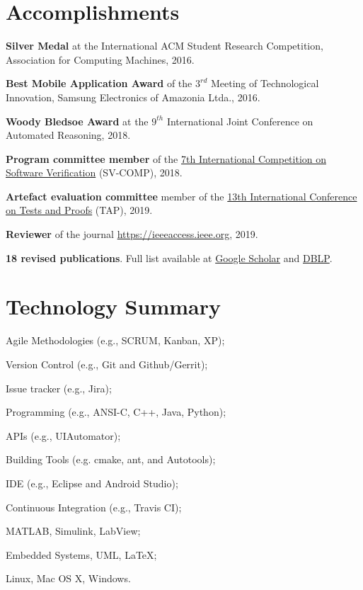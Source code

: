 \documentclass[letterpaper]{article}
\renewenvironment{itemize}{
  \begin{list}{}{
    \setlength{\leftmargin}{1.5em}
  }
}{
  \end{list}
}
\begin{document}
\section*{Accomplishments}
\begin{itemize}
  \item {\bf Silver Medal} at the International ACM Student Research Competition, Association for Computing Machines, 2016.

  \item {\bf Best Mobile Application Award} of the $3^{rd}$ Meeting of Technological Innovation, Samsung Electronics of Amazonia Ltda., 2016.
  
  \item {\bf Woody Bledsoe Award} at the $9^{th}$ International Joint Conference on Automated Reasoning, 2018.
  
  \item {\bf Program committee member} of the \href{https://sv-comp.sosy-lab.org/2018/committee.php}{7th International Competition on Software Verification} (SV-COMP), 2018.
  
  \item {\bf Artefact evaluation committee} member of the \href{https://tap.sosy-lab.org/2019/committee.php}{13th International Conference on Tests and Proofs} (TAP), 2019.
  
  \item {\bf Reviewer} of the journal \href{IEEE Access}{https://ieeeaccess.ieee.org}, 2019.

  \item {\bf 18 revised publications}. Full list available at \href{https://scholar.google.com/citations?hl=en&user=6bNQcz0AAAAJ}{Google Scholar} and \href{https://dblp.uni-trier.de/pers/hd/m/Monteiro:Felipe_R=}{DBLP}.
\end{itemize}

\section*{Technology Summary}
   \begin{itemize}
   \item{Agile Methodologies (e.g., SCRUM, Kanban, XP);}
   \item{Version Control (e.g., Git and Github/Gerrit);}
   \item{Issue tracker (e.g., Jira);}
   \item{Programming (e.g., ANSI-C, C++, Java, Python);}
   \item{APIs (e.g., UIAutomator);}
   \item{Building Tools (e.g. cmake, ant, and Autotools);}
   \item{IDE (e.g., Eclipse and Android Studio);}
   \item{Continuous Integration (e.g., Travis CI);}
   \item{MATLAB, Simulink, LabView;}
   \item{Embedded Systems, UML, \LaTeX;}
   \item{Linux, Mac OS X, Windows.}
   \end{itemize}
   
\end{document}
